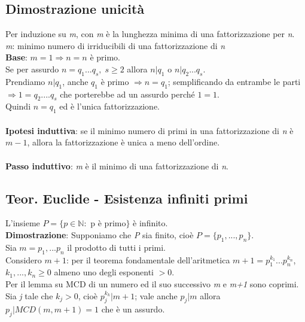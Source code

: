 \subsection{Dimostrazione unicità}
Per induzione su \textit{m}, con \textit{m} è la lunghezza minima di una fattorizzazione per \textit{n}.
\\
\textit{m}: minimo numero di irriducibili di una fattorizzazione di \textit{n}
\\
\textbf{Base}: \(m=1\Rightarrow n=n\) è primo.
\\
Se per assurdo \(n=q_1...q_s,\; s\geq 2\) allora \(n|q_1\) o \(n|q_2...q_s\).
\\
Prendiamo \(n|q_1\), anche \(q_1\) è primo \(\Rightarrow n=q_1\); semplificando da entrambe le parti \(\Rightarrow 1=q_2....q_s\) che porterebbe ad un assurdo perché \(1=1\).
\\
Quindi \(n=q_1\) ed è l'unica fattorizzazione.
\\\\
\textbf{Ipotesi induttiva}: se il minimo numero di primi in una fattorizzazione di \textit{n} è \(m-1\), allora la fattorizzazione è unica a meno dell'ordine.
\\\\
\textbf{Passo induttivo}: \textit{m} è il minimo di una fattorizzazione di \textit{n}.

\subsection{Teor. Euclide - Esistenza infiniti primi}
L'insieme \(P=\{p\in\mathbb{N} :\) p è primo\(\}\) è infinito.
\\
\textbf{Dimostrazione}: Supponiamo che \textit{P} sia finito, cioè \(P=\{p_1,...,p_n\}\).
\\
Sia \(m=p_1,...p_n\) il prodotto di tutti i primi.
\\
Considero \(m+1\): per il teorema fondamentale dell'aritmetica \(m+1=p_1^{k_1}...p_n^{k_n}\), \(k_1,...,k_n\geq 0\) almeno uno degli esponenti \(>0\).
\\
Per il lemma su MCD di un numero ed il suo successivo \textit{m} e \textit{m+1} sono coprimi.
\\
Sia \textit{j} tale che \(k_j>0\), cioè \(p_j^{k_k}|m+1\); vale anche \(p_j|m\) allora \(p_j|MCD(m, m+1)=1\) che è un assurdo.
